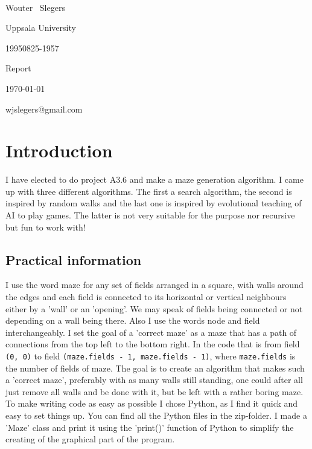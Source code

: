 \documentclass[10pt, a4paper, twoside]{amsart}
\makeatletter
\newcommand{\1}{\mathbbm{1}}
\newcommand\textbox[1]{
  \parbox{.333\textwidth}{#1}}
\newcommand{\courseName} {A3.6 Maze Generation}
\newcommand{\firstName}  {Wouter}
\newcommand{\lastName}   {Slegers}
\newcommand{\studId}     {19950825-1957}
\renewcommand{\email}    {wjslegers@gmail.com}
\makeatother
\begin{document}
\noindent{\huge\bf \courseName}\\
\noindent\textbox{\sc \firstName~ \lastName \hfill}\textbox{\hfil Uppsala University \hfil}\textbox{\hfill \studId}
\noindent\textbox{\large\sc Report \hfill}\textbox{\hfil \today \hfil}\textbox{\hfill \email}
\bigskip


\section*{Introduction}
I have elected to do project A3.6 and make a maze generation algorithm. I came up with three different algorithms. The first a search algorithm, the second is inspired by random walks and the last one is inspired by evolutional teaching of AI to play games. The latter is not very suitable for the purpose nor recursive but fun to work with!

\subsection*{Practical information}
I use the word maze for any set of fields arranged in a square, with walls around the edges and each field is connected to its horizontal or vertical neighbours either by a 'wall' or an 'opening'. We may speak of fields being connected or not depending on a wall being there. Also I use the words node and field interchangeably.
I set the goal of a 'correct maze' as a maze that has a path of connections from the top left to the bottom right. In the code that is from field \verb+(0, 0)+ to field \verb+(maze.fields - 1, maze.fields - 1)+, where \verb+maze.fields+ is the number of fields of maze. The goal is to create an algorithm that makes such a 'correct maze', preferably with as many walls still standing, one could after all just remove all walls and be done with it, but be left with a rather boring maze.\\

To make writing code as easy as possible I chose Python, as I find it quick and easy to set things up. 
You can find all the Python files in the zip-folder.
I made a 'Maze' class and print it using the 'print()' function of Python to simplify the creating of the graphical part of the program.
\end{document}
